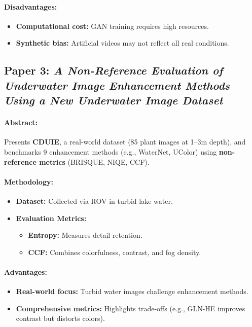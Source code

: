 \documentclass{article}
\begin{document}
\paragraph{Disadvantages:}
\begin{itemize}
    \item \textbf{Computational cost:} GAN training requires high resources.
    \item \textbf{Synthetic bias:} Artificial videos may not reflect all real conditions.
\end{itemize}

\subsection{Paper 3: \textit{A Non-Reference Evaluation of Underwater Image Enhancement Methods Using a New Underwater Image Dataset}}

\paragraph{Abstract:}  
Presents \textbf{CDUIE}, a real-world dataset (85 plant images at 1–3m depth), and benchmarks 9 enhancement methods (e.g., WaterNet, UColor) using \textbf{non-reference metrics} (BRISQUE, NIQE, CCF).

\paragraph{Methodology:}
\begin{itemize}
    \item \textbf{Dataset:} Collected via ROV in turbid lake water.
    \item \textbf{Evaluation Metrics:}
    \begin{itemize}
        \item \textbf{Entropy:} Measures detail retention.
        \item \textbf{CCF:} Combines colorfulness, contrast, and fog density.
    \end{itemize}
\end{itemize}

\paragraph{Advantages:}
\begin{itemize}
    \item \textbf{Real-world focus:} Turbid water images challenge enhancement methods.
    \item \textbf{Comprehensive metrics:} Highlights trade-offs (e.g., GLN-HE improves contrast but distorts colors).
\end{itemize}
\end{document}

